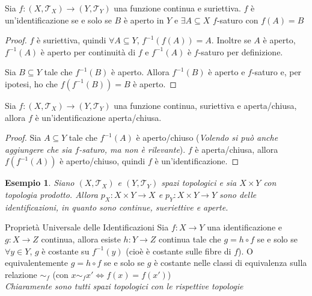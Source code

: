 \documentclass[11pt,a4paper,twoside]{article}
\newtheorem{es}{Esempio}
\theoremstyle{definition}
\begin{document}
\begin{lemma}{}{}\label{ident}
	Sia $f: (X, \mathcal T_X) \to (Y, \mathcal T_Y)$ una funzione continua e suriettiva. $f$ è un'identificazione se e solo se $B$ è aperto in $Y$ e $\exists A \subseteq X$ $f$-saturo con $f(A)=B$
\end{lemma}

\begin{proof}
	\fbox{$\Rightarrow$} $f$ è suriettiva, quindi $\forall A \subseteq Y$, $f^{-1}(f(A))=A$. Inoltre se $A$ è aperto, $f^{-1}(A)$ è aperto per continuità di $f$ e $f^{-1}(A)$ è $f$-saturo per definizione.

	\fbox{$\Leftarrow$} Sia $B \subseteq Y$ tale che $f^{-1}(B)$ è aperto. Allora $f^{-1}(B)$ è aperto e $f$-saturo e, per ipotesi, ho che $f(f^{-1}(B))=B$ è aperto.
\end{proof}

\begin{lemma}{}{}
	Sia $f:(X, \mathcal T_X) \to (Y, \mathcal T_Y)$ una funzione continua, suriettiva e aperta/chiusa, allora $f$ è un'identificazione aperta/chiusa.
\end{lemma}

\begin{proof}
	Sia $A \subseteq Y$ tale che $f^{-1}(A)$ è aperto/chiuso (\textit{Volendo si può anche aggiungere che sia $f$-saturo, ma non è rilevante}). $f$ è aperta/chiusa, allora $f(f^{-1}(A))$ è aperto/chiuso, quindi $f$ è un'identificazione.
\end{proof}

\begin{es}\label{49}
	Siano $(X, \mathcal T_X)$ e $(Y,\mathcal T_Y)$ spazi topologici e sia $X \times Y$ con topologia prodotto. Allora $p_X:X\times Y \to X$ e $p_Y:X \times Y \to Y$ sono delle identificazioni, in quanto sono continue, sueriettive e aperte.
\end{es}

\begin{lemma}{Proprietà Universale delle Identificazioni}{}
	Sia $f:X \to Y$ una identificazione e $g:X \to Z$ continua, allora esiste $h:Y \to Z$ continua tale che $g = h \circ f$ se e solo se $\forall y \in Y$, $g$ è costante su $f^{-1}(y)$ (cioè è costante sulle fibre di $f$). O equivalentemente $g = h\circ f$ se e solo se $g$ è costante nelle classi di equivalenza sulla relazione $\sim_f$ (con $x \sim_f x' \Leftrightarrow f(x) = f(x')$)\\
	\textit{Chiaramente sono tutti spazi topologici con le rispettive topologie}
\end{lemma}
\end{document}
